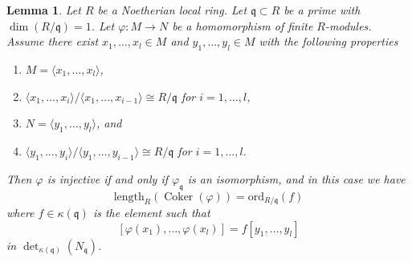 \documentclass[10pt,a4paper]{amsart}
\theoremstyle{plain}
\newtheorem{lemma}[subsection]{Lemma}
\theoremstyle{definition}
\theoremstyle{remark}
\numberwithin{equation}{subsection}
\def\Coker{\mathop{\mathrm{Coker}}}
\begin{document}
\begin{lemma}
\label{lemma-key-lemma}
Let $R$ be a Noetherian local ring.
Let $\mathfrak q \subset R$ be a prime with $\dim(R/\mathfrak q) = 1$.
Let $\varphi : M \to N$ be a homomorphism of finite $R$-modules.
Assume there exist $x_1, \ldots, x_l \in M$ and $y_1, \ldots, y_l \in M$
with the following properties
\begin{enumerate}
\item $M = \langle x_1, \ldots, x_l\rangle$,
\item $\langle x_1, \ldots, x_i\rangle / \langle x_1, \ldots, x_{i - 1}\rangle
\cong R/\mathfrak q$ for $i = 1, \ldots, l$,
\item $N = \langle y_1, \ldots, y_l\rangle$, and
\item $\langle y_1, \ldots, y_i\rangle / \langle y_1, \ldots, y_{i - 1}\rangle
\cong R/\mathfrak q$ for $i = 1, \ldots, l$.
\end{enumerate}
Then $\varphi$ is injective if and only if $\varphi_{\mathfrak q}$ is an
isomorphism, and in this case we have
$$
\text{length}_R(\Coker(\varphi)) = \text{ord}_{R/\mathfrak q}(f)
$$
where $f \in \kappa(\mathfrak q)$ is the element such that
$$
[\varphi(x_1), \ldots, \varphi(x_l)] = f [y_1, \ldots, y_l]
$$
in $\det_{\kappa(\mathfrak q)}(N_{\mathfrak q})$.
\end{lemma}
\end{document}
